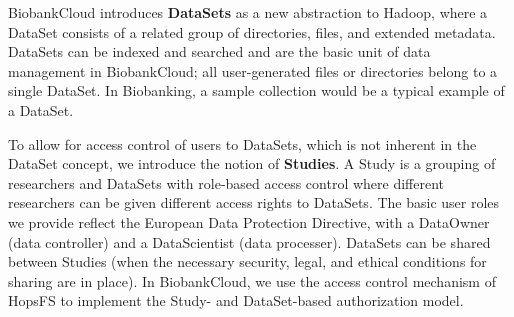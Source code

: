 BiobankCloud introduces \textbf{DataSets} as a new abstraction to Hadoop, where a DataSet consists of a related group of directories, files, and extended metadata. DataSets can be indexed and searched and are the basic unit of data management in BiobankCloud; all user-generated files or directories belong to a single DataSet. In Biobanking, a sample collection would be a typical example of a DataSet. 

To allow for access control of users to DataSets, which is not inherent in the DataSet concept, we introduce the notion of \textbf{Studies}. A Study is a grouping of researchers and DataSets with role-based access control where different researchers can be given different access rights to DataSets. The basic user roles we provide reflect the European Data Protection Directive, with a DataOwner (data controller) and a DataScientist (data processer). DataSets can be shared between Studies (when the necessary security, legal, and ethical conditions for sharing are in place).  In BiobankCloud, we use the access control mechanism of HopsFS to implement the Study- and DataSet-based authorization model. 
